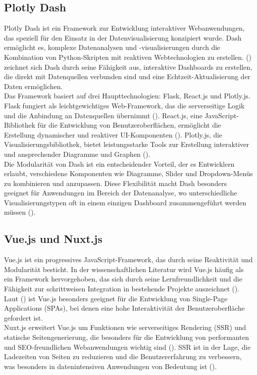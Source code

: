 \documentclass[a4paper, 12pt]{scrartcl}
\begin{document}
\subsection{Plotly Dash}
Plotly Dash ist ein Framework zur Entwicklung interaktiver Webanwendungen, das speziell für den Einsatz in der Datenvisualisierung konzipiert wurde. Dash ermöglicht es, komplexe Datenanalysen und -visualisierungen durch die Kombination von Python-Skripten mit reaktiven Webtechnologien zu erstellen. (\cite[S.119]{Dibia2023}) zeichnet sich Dash durch seine Fähigkeit aus, interaktive Dashboards zu erstellen, die direkt mit Datenquellen verbunden sind und eine Echtzeit-Aktualisierung der Daten ermöglichen.\\[1em] Das Framework basiert auf drei Haupttechnologien: Flask, React.js und Plotly.js. Flask fungiert als leichtgewichtiges Web-Framework, das die serverseitige Logik und die Anbindung an Datenquellen übernimmt (\cite[S.119]{Dibia2023}). React.js, eine JavaScript-Bibliothek für die Entwicklung von Benutzeroberflächen, ermöglicht die Erstellung dynamischer und reaktiver UI-Komponenten (\cite[S.119]{Dibia2023}). Plotly.js, die Visualisierungsbibliothek, bietet leistungsstarke Tools zur Erstellung interaktiver und ansprechender Diagramme und Graphen (\cite[S.119]{Dibia2023}).\\[1em] Die Modularität von Dash ist ein entscheidender Vorteil, der es Entwicklern erlaubt, verschiedene Komponenten wie Diagramme, Slider und Dropdown-Menüs zu kombinieren und anzupassen. Diese Flexibilität macht Dash besonders geeignet für Anwendungen im Bereich der Datenanalyse, wo unterschiedliche Visualisierungstypen oft in einem einzigen Dashboard zusammengeführt werden müssen (\cite[S.119]{Dibia2023}).

\subsection{Vue.js und Nuxt.js}
Vue.js ist ein progressives JavaScript-Framework, das durch seine Reaktivität und Modularität besticht. In der wissenschaftlichen Literatur wird Vue.js häufig als ein Framework hervorgehoben, das sich durch seine Lernfreundlichkeit und die Fähigkeit zur schrittweisen Integration in bestehende Projekte auszeichnet (\cite[S.119]{Dibia2023}). Laut (\cite[S.119]{Dibia2023}) ist Vue.js besonders geeignet für die Entwicklung von Single-Page Applications (SPAs), bei denen eine hohe Interaktivität der Benutzeroberfläche gefordert ist. \\[1em] Nuxt.js erweitert Vue.js um Funktionen wie serverseitiges Rendering (SSR) und statische Seitengenerierung, die besonders für die Entwicklung von performanten und SEO-freundlichen Webanwendungen wichtig sind (\cite[S.119]{Dibia2023}). SSR ist in der Lage, die Ladezeiten von Seiten zu reduzieren und die Benutzererfahrung zu verbessern, was besonders in datenintensiven Anwendungen von Bedeutung ist (\cite[S.119]{Dibia2023}).
\end{document}
